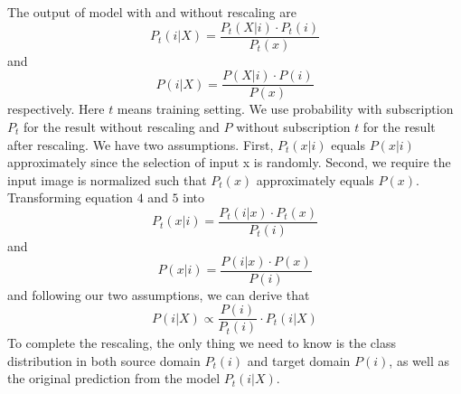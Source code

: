 \documentclass{article}
\begin{document}
The output of model with and without rescaling are
\begin{equation}
    P_t(i|X) = \frac{P_t(X|i) \cdot P_t(i)}{P_t(x)}
\end{equation}
and
\begin{equation}
    P(i|X) = \frac{P(X|i) \cdot P(i)}{P(x)}
\end{equation}
respectively. Here $t$ means training setting. We use probability with subscription $P_t$ for the result without rescaling and $P$ without subscription $t$ for the result after rescaling. We have two assumptions. First, $P_t(x|i)$ equals $P(x|i)$ approximately since the selection of input x is randomly. Second, we require the input image is normalized such that $P_t(x)$ approximately equals $P(x)$. Transforming equation $4$ and $5$ into 
\begin{equation}
    P_t(x|i) = \frac{P_t(i|x) \cdot P_t(x)}{P_t(i)}
\end{equation}
and
\begin{equation}
    P(x|i) = \frac{P(i|x) \cdot P(x)}{P(i)}
\end{equation}
and following our two assumptions, we can derive that 
\begin{equation}\label{eqn:rescaling}
    P(i|X) \propto \frac{P(i)}{P_t(i)} \cdot P_t(i|X)
\end{equation}
To complete the rescaling, the only thing we need to know is the class distribution in both source domain $P_t(i)$ and target domain $P(i)$, as well as the original prediction from the model $P_t(i|X)$.
\end{document}
